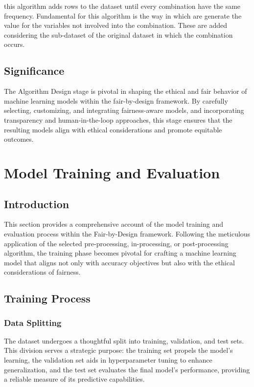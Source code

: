\documentclass[12pt,a4paper,openright,twoside]{book}
\begin{document}
this algorithm adds rows to the dataset until every combination have the same frequency. Fundamental for this algorithm is the way in which are generate the value for the variables not involved into the combination. These are added considering the sub-dataset of the original dataset in which the combination occurs. 


\subsection{Significance}

The Algorithm Design stage is pivotal in shaping the ethical and fair behavior of machine learning models within the fair-by-design framework. By carefully selecting, customizing, and integrating fairness-aware models, and incorporating transparency and human-in-the-loop approaches, this stage ensures that the resulting models align with ethical considerations and promote equitable outcomes.

\section{Model Training and Evaluation}

\subsection{Introduction}

This section provides a comprehensive account of the model training and evaluation process within the Fair-by-Design framework. Following the meticulous application of the selected pre-processing, in-processing, or post-processing algorithm, the training phase becomes pivotal for crafting a machine learning model that aligns not only with accuracy objectives but also with the ethical considerations of fairness.

\subsection{Training Process}

\subsubsection{Data Splitting}

The dataset undergoes a thoughtful split into training, validation, and test sets. This division serves a strategic purpose: the training set propels the model's learning, the validation set aids in hyperparameter tuning to enhance generalization, and the test set evaluates the final model's performance, providing a reliable measure of its predictive capabilities.
\end{document}
